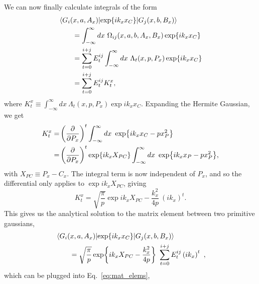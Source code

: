 \documentclass[
    prd, twocolumn, superscriptaddress, nofootinbib, amsmath, amssymb,
    aps, floatfix,preprintnumbers
]{revtex4-2}
\begin{document}
    We can now finally calculate integrals of the form
    \begin{equation}
    \begin{split}
        &\mel{G_i (x, a, A_x)}{\exp{i k_x x_C}}{G_j(x, b, B_x)} \\
        &\qquad = \int_{-\infty}^\infty dx\ \Omega_{ij}(x, a, b, A_x, B_x) \exp{i k_x x_C}\\
        &\qquad =\sum_{t=0}^{i+j}E_t^{ij} \int_{-\infty}^\infty dx\ \Lambda_t(x, p, P_x) \exp{i k_x x_C}\\
        &\qquad =  \sum_{t=0}^{i+j}E_t^{ij} K_t^x,
    \end{split}
    \end{equation}
    where $\displaystyle K_t^x \equiv \int_{-\infty}^\infty dx\ \Lambda_t(x, p, P_x) \exp{i k_x x_C}.$ Expanding the Hermite Gaussian, we get
    \begin{equation}
        \begin{split}
            K_t^x =& \left(\pdv{P_x}\right)^t \int_{-\infty}^\infty dx\ \exp{ik_x x_C - px_P^2}\\
            =& \left(\pdv{P_x}\right)^t \exp{ik_x X_{PC}} \int_{-\infty}^\infty dx\ \exp{ik_x x_P - px_P^2} ,
        \end{split}
    \end{equation}
    with $X_{PC}\equiv P_x - C_x$. The integral term is now independent of $P_x$, and so the differential only applies to $\exp{ik_xX_{PC}}$, giving
    \begin{equation}
        K_t^x = \sqrt{\frac{\pi}{p}}\exp{ik_xX_{PC} - \frac{k_x^2}{4p}}\ \left(ik_x\right)^t .
    \end{equation}
    This gives us the analytical solution to the matrix element between two primitive gaussians, 
    \begin{equation}
        \begin{split}
            &\mel{G_i (x, a, A_x)}{\exp{i k_x x_C}}{G_j(x, b, B_x)} \\
            &\qquad = \sqrt{\frac{\pi}{p}}\exp{ik_xX_{PC} - \frac{k_x^2}{4p}}\ \sum_{t = 0}^{i+j} E_t^{ij} \left(ik_x\right)^t\ ,
        \end{split}
    \end{equation}
    which can be plugged into Eq.~\eqref{eq:mat_elems}, 
\end{document}
